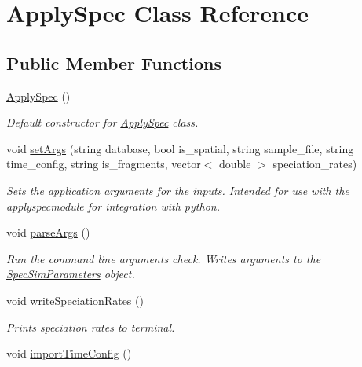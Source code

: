 \hypertarget{class_apply_spec}{}\section{Apply\+Spec Class Reference}
\label{class_apply_spec}
\subsection*{Public Member Functions}
\begin{DoxyCompactItemize}
\item 
\hyperlink{class_apply_spec_a5063b84e505d6c8e9feeb81befcf8150}{Apply\+Spec} ()\hypertarget{class_apply_spec_a5063b84e505d6c8e9feeb81befcf8150}{}\label{class_apply_spec_a5063b84e505d6c8e9feeb81befcf8150}

\begin{DoxyCompactList}\small\item\em Default constructor for \hyperlink{class_apply_spec}{Apply\+Spec} class. \end{DoxyCompactList}\item 
void \hyperlink{class_apply_spec_a1a106fa5487b52076c30619048154c32}{set\+Args} (string database, bool is\+\_\+spatial, string sample\+\_\+file, string time\+\_\+config, string is\+\_\+fragments, vector$<$ double $>$ speciation\+\_\+rates)
\begin{DoxyCompactList}\small\item\em Sets the application arguments for the inputs. Intended for use with the applyspecmodule for integration with python. \end{DoxyCompactList}\item 
void \hyperlink{class_apply_spec_acd657de841dbf917f677524b6b587913}{parse\+Args} ()
\begin{DoxyCompactList}\small\item\em Run the command line arguments check. Writes arguments to the \hyperlink{struct_spec_sim_parameters}{Spec\+Sim\+Parameters} object. \end{DoxyCompactList}\item 
void \hyperlink{class_apply_spec_a09e5fbeb086f56a7d9eb66ca3e2d3c06}{write\+Speciation\+Rates} ()\hypertarget{class_apply_spec_a09e5fbeb086f56a7d9eb66ca3e2d3c06}{}\label{class_apply_spec_a09e5fbeb086f56a7d9eb66ca3e2d3c06}

\begin{DoxyCompactList}\small\item\em Prints speciation rates to terminal. \end{DoxyCompactList}\item 
void \hyperlink{class_apply_spec_aae6c62a4ac54c8e689d5eda77f5e4453}{import\+Time\+Config} ()\hypertarget{class_apply_spec_aae6c62a4ac54c8e689d5eda77f5e4453}{}\label{class_apply_spec_aae6c62a4ac54c8e689d5eda77f5e4453}


\end{DoxyCompactItemize}
